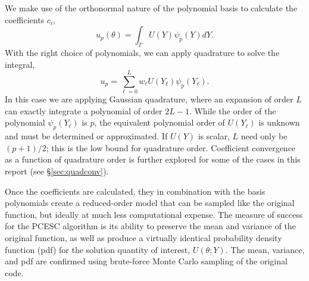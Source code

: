 \documentclass[11pt]{article} %
\begin{document}
We make use of the orthonormal nature of the polynomial basis to calculate the coefficients $c_i$,
\begin{equation}
u_p(\theta) = \int_\Gamma U(Y)\psi_p(Y)dY.
\end{equation}
With the right choice of polynomials, we can apply quadrature to solve the integral,
\begin{equation}
u_p = \sum_{\ell=0}^{L} w_\ell U(Y_\ell) \psi_p(Y_\ell).
\end{equation}
In this case we are applying Gaussian quadrature, where an expansion of order $L$ can exactly integrate a polynomial of order $2L-1$.  While the order of the polynomial $\psi_p(Y_\ell)$ is $p$, the equivalent polynomial order of $U(Y_\ell)$ is unknown and must be determined or approximated.  If $U(Y)$ is scalar, $L$ need only be $(p+1)/2$; this is the low bound for quadrature order.  Coefficient convergence as a function of quadrature order is further explored for some of the cases in this report (see \S \ref{sec:quadconv}).

Once the coefficients are calculated, they in combination with the basis polynomials create a reduced-order model that can be sampled like the original function, but ideally at much less computational expense.  The measure of success for the PCESC algorithm is its ability to preserve the mean and variance of the original function, as well as produce a virtually identical probability density function (pdf) for the solution quantity of interest, $U(\theta;Y)$.  The mean, variance, and pdf are confirmed using brute-force Monte Carlo sampling of the original code.





%
%
%
%
\end{document}
